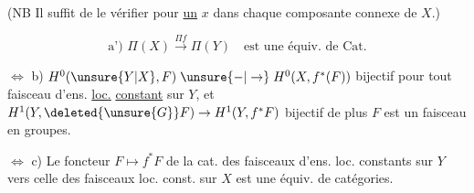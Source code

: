 (NB Il suffit de le vérifier pour \uline{un} $x$ dans chaque composante connexe de $X$.)

\[
 \text{a') }\Pi(X)\xrightarrow{\Pi f}\Pi(Y)\quad\text{est une équiv. de Cat.}
\]

$\Longleftrightarrow$ b) $H^0(\unsure{Y|X},F)\mathrel{\unsure{-|\to}}H^0(X,f^*(F))$ bijectif pour tout faisceau d'ens. \uline{loc.} \uline{constant} sur $Y$, et $H^1(Y,\deleted{\unsure{G}}F)\to H^1(Y,f^*F)$ bijectif   de plus $F$ est un faisceau en groupes.


$\Longleftrightarrow$ c) Le foncteur $F\mapsto f^*F$ de la cat. des faisceaux d'ens. loc. constants sur $Y$ vers celle des faisceaux loc. const. sur $X$ est une équiv. de catégories.
